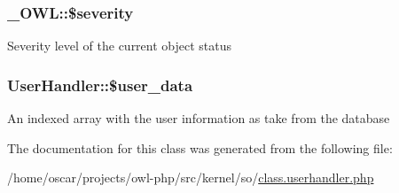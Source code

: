 \subsubsection[{\$severity}]{\setlength{\rightskip}{0pt plus 5cm}\_\-OWL::\$severity}\label{class__OWL_ad26b40a9dbbacb33e299b17826f8327c}
Severity level of the current object status 
\subsubsection[{\$user\_\-data}]{\setlength{\rightskip}{0pt plus 5cm}UserHandler::\$user\_\-data}\label{classUserHandler_ae7a2d59eee65560ac96b860e828bb445}
An indexed array with the user information as take from the database 

The documentation for this class was generated from the following file:\begin{DoxyCompactItemize}
\item 
/home/oscar/projects/owl-\/php/src/kernel/so/\hyperlink{class_8userhandler_8php}{class.userhandler.php}\end{DoxyCompactItemize}
